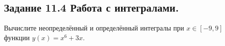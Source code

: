 \subsection*{\textbf{Задание 11.4} Работа с интегралами.}
Вычислите неопределённый и определённый интегралы при $x\in[-9,9]$
функции $y(x) = x^6+3x$.

\begin{figure}[H]
    \renewcommand{\figurename}{Рисунок}
    \label{fig:image_4}
\end{figure}